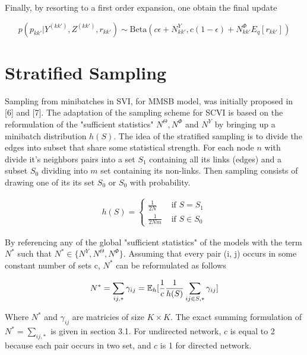 Finally, by resorting to a first order expansion, one obtain the final update

\begin{equation*}
p(p_{kk'} | Y^{(kk')}, Z^{(kk')}, r_{kk'}) \sim \mathrm{Beta}(c\epsilon + N^Y_{kk'}, c(1-\epsilon) + N^\Phi_{kk'} E_q[r_{kk'}])
\end{equation*}


\section{Stratified Sampling}

Sampling from minibatches in SVI, for MMSB model, was initially proposed in [6] and [7]. The adaptation of the sampling scheme for SCVI is based on the reformulation of the "sufficient statistics" $N^\Theta, N^\Phi$ and $N^Y$  by bringing up a minibatch distribution $h(S)$. The idea of the stratified sampling is to divide the edges into subset that share some statistical strength.
For each node $n$ with divide it's neighbors pairs into a set $S_1$ containing all its links (edges) and a subset $S_0$ dividing into  $m$ set containing its non-links. Then sampling consists of drawing one of its its set $S_0$ or $S_0$ with probability.

\begin{align*}
h(S)=\begin{cases}
    \frac{1}{2 N}  & \textrm{ if } S = S_1 \\
    \frac{1}{2 N m}  & \textrm{ if } S \in S_0 
    \end{cases}
\end{align*}


By referencing any of the global "sufficient statistics" of the models with the term $N^*$ such that $N^* \in \{N^Y, N^\Theta, N^\Phi\}$. Assuming that every pair (i, j) occurs in some constant number of sets c, $N^*$ can be reformulated as follows 

\begin{align*}
N^* = \sum_{ij, *} \gamma_{ij} = \mathbb{E}_h[ \frac{1}{c}\frac{1}{h(S)} \sum_{ij \in S, *} \gamma_{ij}  ]
\end{align*}

Where $N^*$ and $\gamma_{ij}$ are matricies of size $K\times K$.
The exact summing formulation of $N^*=\sum_{ij,*}$ is given in section 3.1. For undirected network, $c$ is equal to 2 because each pair occurs in two set, and $c$ is 1 for directed network.


